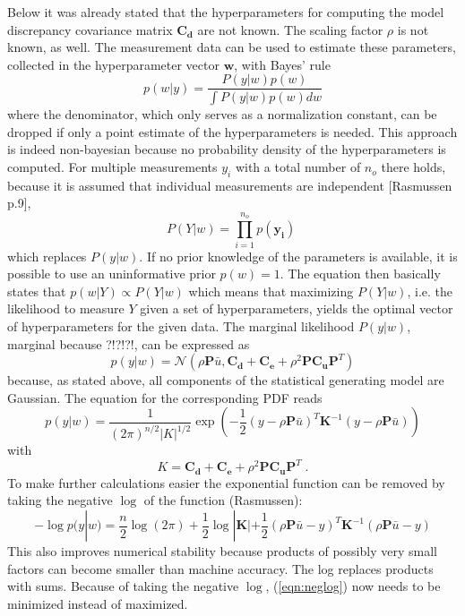 \documentclass[%
  a4paper,oneside,%
  11pt,%
  smallchapters,
  green,%
  rgb, <cmyk>
  ,]{tubsbook}
\begin{document}
Below it was already stated that the hyperparameters for computing the model discrepancy covariance matrix $\bm{C_d}$ are not known. The scaling factor $\rho$ is not known, as well. The measurement data can be used to estimate these parameters, collected in the hyperparameter vector $\bm{w}$, with Bayes' rule 
%
\begin{equation}
p(w|y) = \frac{P(y|w) p(w)}{\int P(y|w) p(w) dw}
\end{equation}
%
where the denominator, which only serves as a normalization constant, can be dropped if only a point estimate of the hyperparameters is needed. This approach is indeed non-bayesian because no probability density of the hyperparameters is computed. For multiple measurements $y_i$ with a total number of $n_o$ there holds, because it is assumed that individual measurements are independent [Rasmussen p.9],
\begin{equation}
P(Y|w) = \prod_{i=1}^{n_o} p(\bm{y_i}) \; 
\end{equation}
which replaces $P(y|w)$.
If no prior knowledge of the parameters is available, it is possible to use an uninformative prior $p(w) = 1$.
The equation then basically states that $p(w|Y) \propto P(Y|w)$ which means that maximizing  $P(Y|w)$, i.e. the likelihood to measure $Y$ given a set of hyperparameters, yields the optimal vector of hyperparameters for the given data. 
The marginal likelihood $P(y|w)$, marginal because ?!?!?!, can be expressed as 
\begin{equation}
p(y|w) = \mathcal{N}(\rho \bm{P}\bar{u}, \bm{C_d}+\bm{C_e} + \rho^2 \bm{P} \bm{C_u} \bm{P}^T)
\end{equation}
because, as stated above, all components of the statistical generating model are Gaussian.
The equation for the corresponding PDF reads
\begin{equation}
p(y|w) = \frac{1}{(2 \pi)^{n/2} |K|^{1/2} } \exp \left(   -\frac{1}{2} (y - \rho \bm{P}\bar{u})^T \bm{K}^{-1} (y - \rho \bm{P}\bar{u})   \right)
\end{equation}
with
\begin{equation}
K = \bm{C_d}+\bm{C_e} + \rho^2 \bm{P} \bm{C_u} \bm{P}^T \; .
\end{equation}
%
To make further calculations easier the exponential function can be removed by taking the negative $\log$ of the function (Rasmussen):
\begin{equation}
- \log p(y|w) = \frac{n}{2} \log(2 \pi) + \frac{1}{2} \log |\bm{K}| + \frac{1}{2}(\rho \bm{P}\bar{u} - y)^T \bm{K}^{-1} (\rho \bm{P}\bar{u} - y) 
\label{eqn:neglog}
\end{equation}
This also improves numerical stability because products of possibly very small factors can become smaller than machine accuracy. The log replaces products with sums.
Because of taking the negative $\log$, (\ref{eqn:neglog}) now needs to be minimized instead of maximized. 
\end{document}
